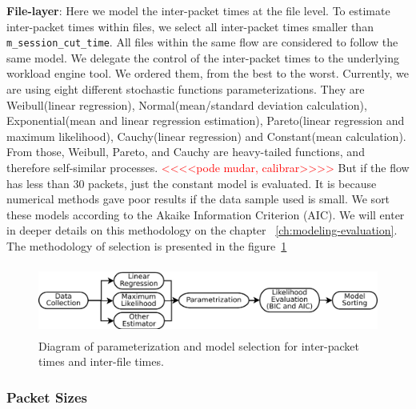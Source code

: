 \textbf{File-layer}: Here we model the inter-packet times at the file level. To estimate inter-packet times within files, we select all inter-packet times smaller than \texttt{m\_session\_cut\_time}. All files within the same flow are considered to follow the same model. We delegate the control of the inter-packet times to the underlying workload engine tool. We ordered them, from the best to the worst. Currently, we are using eight different stochastic functions parameterizations. They are Weibull(linear regression), Normal(mean/standard deviation calculation), Exponential(mean and linear regression estimation), Pareto(linear regression and maximum likelihood), Cauchy(linear regression) and Constant(mean calculation). From those, Weibull, Pareto, and Cauchy are heavy-tailed functions, and therefore self-similar processes. \textcolor{red}{<<<<pode mudar, calibrar>>>>} But if the flow has less than 30 packets, just the constant model is evaluated. It is because numerical methods gave poor results if the data sample used is small. We sort these models according to the Akaike Information Criterion (AIC)\cite{sourcesonoff-paper}\cite{bic-aic-comparision}. We will enter in deeper details on this methodology on the chapter ~\ref{ch:modeling-evaluation}. The methodology of selection is presented in the figure~\ref{fig:model-parameterization}

\begin{figure}[ht!]
    \centering
    \includegraphics[height=0.9in]{figures/ch3/simitar-parametrization}
    \caption{Diagram of parameterization and model selection for inter-packet times and inter-file times.}
    \label{fig:model-parameterization}
\end{figure}


\subsubsection{Packet Sizes}

